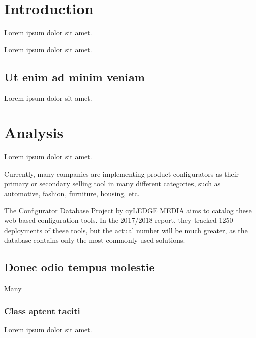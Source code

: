 \chapter*{Introduction}
\setcounter{page}{1}

\begin{chapterabstract}
	Lorem ipsum dolor sit amet.
\end{chapterabstract}

Lorem ipsum dolor sit amet.

\section{Ut enim ad minim veniam}

Lorem ipsum dolor sit amet.

\chapter{Analysis}

\begin{chapterabstract}
	Lorem ipsum dolor sit amet. 
\end{chapterabstract}

Currently, many companies are implementing product configurators as their primary or secondary selling tool in many different categories, such as automotive, fashion, furniture, housing, etc.

The Configurator Database Project by cyLEDGE MEDIA aims to catalog these web-based configuration tools. In the 2017/2018 report, they tracked 1250 deployments of these tools, but the actual number will be much greater, as the database contains only the most commonly used solutions. \cite{cyLEDGE2018}

\section{Donec odio tempus molestie}

Many

\subsection{Class aptent taciti}

Lorem ipsum dolor sit amet.